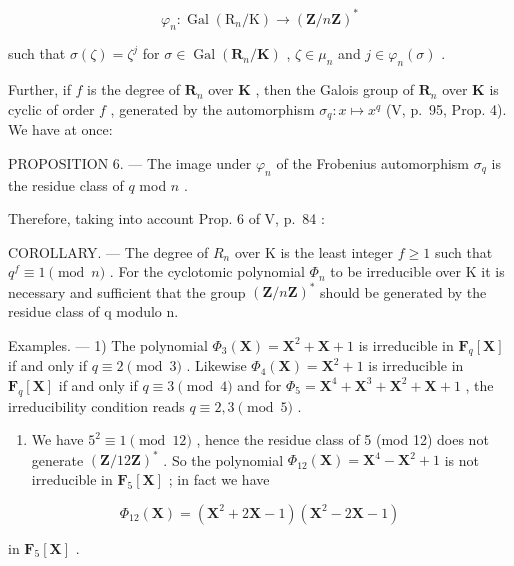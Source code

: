 \[
\varphi_ {n}: \operatorname{Gal} \left(\mathrm{R} _ {n} / \mathrm{K}\right)\rightarrow (\mathbf {Z} / n \mathbf {Z}) ^ {*}
\]

such that \(\sigma(\zeta) = \zeta^j\) for \(\sigma \in \operatorname{Gal}(\mathbf{R}_n / \mathbf{K})\) , \(\zeta \in \mu_n\) and \(j \in \varphi_n(\sigma)\) .

Further, if \(f\) is the degree of \(\mathbf{R}_n\) over \(\mathbf{K}\) , then the Galois group of \(\mathbf{R}_n\) over \(\mathbf{K}\) is cyclic of order \(f\) , generated by the automorphism \(\sigma_q: x \mapsto x^q\) (V, p.~95, Prop. 4). We have at once:

PROPOSITION 6. --- The image under \(\varphi_{n}\) of the Frobenius automorphism \(\sigma_{q}\) is the residue class of \(q\) mod \(n\) .

Therefore, taking into account Prop. 6 of V, p.~84 :

COROLLARY. --- The degree of \(R_{n}\) over K is the least integer \(f \geqslant 1\) such that \(q^{f} \equiv 1 \pmod{n}\) . For the cyclotomic polynomial \(\Phi_{n}\) to be irreducible over K it is necessary and sufficient that the group \((\mathbf{Z}/n\mathbf{Z})^{*}\) should be generated by the residue class of q modulo n.

Examples. --- 1) The polynomial \(\Phi_3(\mathbf{X}) = \mathbf{X}^2 + \mathbf{X} + 1\) is irreducible in \(\mathbf{F}_q[\mathbf{X}]\) if and only if \(q \equiv 2 \pmod{3}\) . Likewise \(\Phi_4(\mathbf{X}) = \mathbf{X}^2 + 1\) is irreducible in \(\mathbf{F}_q[\mathbf{X}]\) if and only if \(q \equiv 3 \pmod{4}\) and for \(\Phi_5 = \mathbf{X}^4 + \mathbf{X}^3 + \mathbf{X}^2 + \mathbf{X} + 1\) , the irreducibility condition reads \(q \equiv 2, 3 \pmod{5}\) .

\begin{enumerate}
\def\labelenumi{\arabic{enumi})}
\setcounter{enumi}{1}
\tightlist
\item
  We have \(5^2 \equiv 1 \pmod{12}\) , hence the residue class of 5 (mod 12) does not generate \((\mathbf{Z}/12\mathbf{Z})^*\) . So the polynomial \(\Phi_{12}(\mathbf{X}) = \mathbf{X}^4 - \mathbf{X}^2 + 1\) is not irreducible in \(\mathbf{F}_5[\mathbf{X}]\) ; in fact we have
\end{enumerate}

\[
\Phi_ {12} (\mathbf {X}) = \left(\mathbf {X} ^ {2} + 2 \mathbf {X} - 1\right) \left(\mathbf {X} ^ {2} - 2 \mathbf {X} - 1\right)
\]

in \(\mathbf{F}_5[\mathbf{X}]\) .

